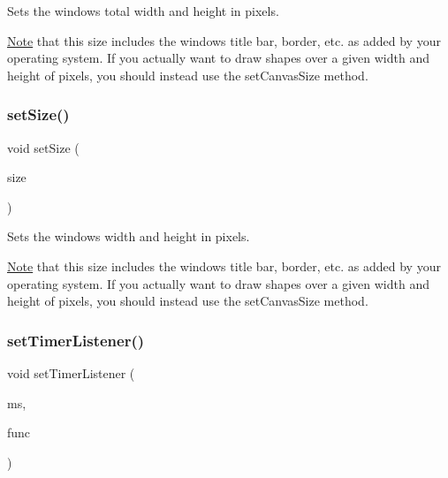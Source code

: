 Sets the window\textquotesingle{}s total width and height in pixels. 

\mbox{\hyperlink{classNote}{Note}} that this size includes the window\textquotesingle{}s title bar, border, etc. as added by your operating system. If you actually want to draw shapes over a given width and height of pixels, you should instead use the set\+Canvas\+Size method. \mbox{\label{classGWindow_ae2b628228f192c2702c4ce941b2af68f}} 
\subsubsection{\texorpdfstring{set\+Size()}{setSize()}\hspace{0.1cm}{\footnotesize\ttfamily [2/2]}}
{\footnotesize\ttfamily void set\+Size (\begin{DoxyParamCaption}\item[{const \mbox{\hyperlink{classGDimension}{G\+Dimension}} \&}]{size }\end{DoxyParamCaption})\hspace{0.3cm}{\ttfamily [virtual]}}



Sets the window\textquotesingle{}s width and height in pixels. 

\mbox{\hyperlink{classNote}{Note}} that this size includes the window\textquotesingle{}s title bar, border, etc. as added by your operating system. If you actually want to draw shapes over a given width and height of pixels, you should instead use the set\+Canvas\+Size method. \mbox{\label{classGWindow_ae0d5df4c2ed47156cbba7da55362e4e1}} 
\subsubsection{\texorpdfstring{set\+Timer\+Listener()}{setTimerListener()}\hspace{0.1cm}{\footnotesize\ttfamily [1/2]}}
{\footnotesize\ttfamily void set\+Timer\+Listener (\begin{DoxyParamCaption}\item[{double}]{ms,  }\item[{G\+Event\+Listener}]{func }\end{DoxyParamCaption})\hspace{0.3cm}{\ttfamily [virtual]}}



